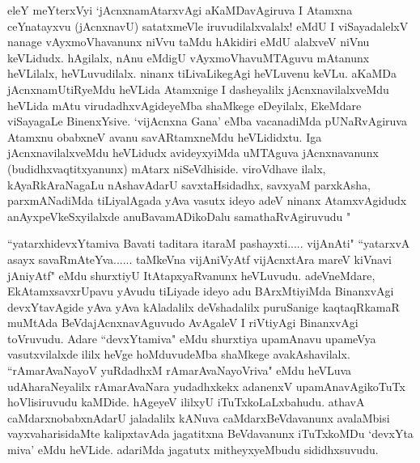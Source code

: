 
\centerline{}

\centerline{}

\begin{artha}
eleY meYterxVyi `jAcnxnamAtarxvAgi aKaMDavAgiruva I Atamxna ceYnatayxvu 
(jAcnxnavU) satatxmeVle iruvudilalxvalalx! eMdU I viSayadalelxV nanage 
vAyxmoVhavanunx niVvu taMdu hAkidiri eMdU alalxveV niVnu keVLidudx. hAgilalx, 
nAnu eMdigU vAyxmoVhavuMTAguvu mAtanunx heVLilalx, heVLuvudilalx. ninanx 
tiLivaLikegAgi heVLuvenu keVLu. aKaMDa jAcnxnamUtiRyeMdu heVLida Atamxnige I 
dasheyalilx jAcnxnavilalxveMdu heVLida mAtu virudadhxvAgideyeMba shaMkege 
eDeyilalx, EkeMdare viSayagaLe BinenxYsive. `vijAcnxna Gana' eMba vacanadiMda 
pUNaRvAgiruva Atamxnu obabxneV avanu savARtamxneMdu heVLididxtu. Iga 
jAcnxnavilalxveMdu heVLidudx avideyxyiMda uMTAguva jAcnxnavanunx 
(budidhxvaqtitxyanunx) mAtarx niSeVdhiside. viroVdhave ilalx, kAyaRkAraNagaLu 
nAshavAdarU savxtaHsidadhx, savxyaM parxkAsha, parxmANadiMda tiLiyalAgada yAva 
vasutx ideyo adeV ninanx AtamxvAgidudx anAyxpeVkeSxyilalxde anuBavamADikoDalu 
samathaRvAgiruvudu "
\end{artha}

\begin{artha}
``yatarxhidevxYtamiva Bavati taditara itaraM pashayxti..... vijAnAti"  ``yatarxvA asayx savaRmAteYva...... taMkeVna vijAniVyAtf vijAcnxtAra mareV kiVnavi jAniyAtf" eMdu shurxtiyU ItAtapxyaRvanunx heVLuvudu. adeVneMdare, 
EkAtamxsavxrUpavu yAvudu tiLiyade ideyo adu BArxMtiyiMda BinanxvAgi  
devxYtavAgide  yAva yAva kAladalilx deVshadalilx puruSanige kaqtaqRkamaR muMtAda 
BeVdajAcnxnavAguvudo AvAgaleV I riVtiyAgi BinanxvAgi toVruvudu. Adare 
``devxYtamiva" eMdu shurxtiya upamAnavu upameVya vasutxvilalxde ililx heVge 
hoMduvudeMba shaMkege avakAshavilalx. ``rAmarAvaNayoV yuRdadhxM rAmarAvaNayoVriva" eMdu heVLuva udAharaNeyalilx 
rAmarAvaNara yudadhxkekx adanenxV upamAnavAgikoTuTx hoVlisiruvudu kaMDide. 
hAgeyeV ililxyU iTuTxkoLaLxbahudu. athavA caMdarxnobabxnAdarU jaladalilx kANuva 
caMdarxBeVdavanunx avalaMbisi vayxvaharisidaMte kalipxtavAda jagatitxna 
BeVdavanunx iTuTxkoMDu `devxYta miva' eMdu heVLide. adariMda jagatutx 
mitheyxyeMbudu sididhxsuvudu. 
\end{artha}

